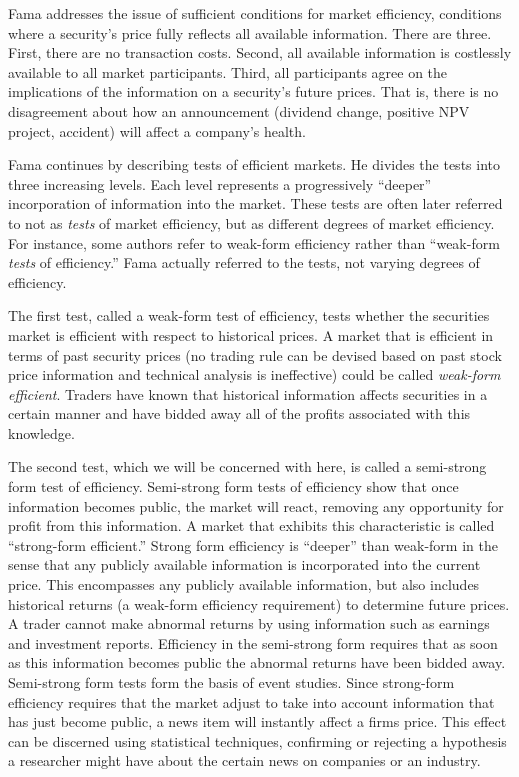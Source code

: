 Fama addresses the issue of sufficient conditions for market
efficiency, conditions where a security's price fully reflects all
available information.  There are three.  First, there are no
transaction costs.  Second, all available information is costlessly
available to all market participants.  Third, all participants
agree
on the implications of the information on a security's future
prices.
That is, there is no disagreement about how an announcement
(dividend
change, positive NPV project, accident) will affect a company's
health.

Fama continues by describing tests of efficient markets.  He
divides
the tests into three increasing levels.  Each level represents a
progressively ``deeper'' incorporation of information into the
market.
These tests are often later referred to not as {\em tests}
of market efficiency, but as different degrees of market
efficiency.  For instance, some authors refer to
weak-form efficiency rather than ``weak-form {\em tests} of
efficiency.''
Fama actually referred to the tests, not varying degrees of
efficiency.

The first test, called a weak-form test of efficiency, tests
whether the securities market is efficient with respect to
historical prices.  A market that is efficient in terms of past
security prices (no trading rule can be devised based on
past stock price information and technical analysis is
ineffective) could be called {\em weak-form efficient}.
Traders have known that historical information affects
securities in a certain manner and have bidded away all of the
profits
associated with this knowledge.

The second test, which we will be concerned with here, is
called a semi-strong form test of efficiency.  Semi-strong
form tests of efficiency show that once information becomes
public, the market will react, removing any opportunity for
profit from this information.  A market that exhibits this
characteristic is called ``strong-form efficient.''  Strong
form efficiency  is ``deeper'' than
weak-form in the sense that any publicly available information is 
incorporated into the current price.  This encompasses any
publicly available information, but also includes historical
returns (a weak-form efficiency requirement) to determine future
prices.  
A trader cannot make abnormal returns by
using information such as earnings and investment reports. 
Efficiency
in the semi-strong form requires that as soon as this information
becomes public the abnormal returns have been bidded away. 
Semi-strong form tests form the basis of event studies.  
Since strong-form efficiency requires that the market adjust
to take into account information that has just become
public, a news item will instantly affect a firms price. 
This effect can be discerned using statistical techniques,
confirming or rejecting a hypothesis a researcher might have
about the certain news on companies or an industry.

